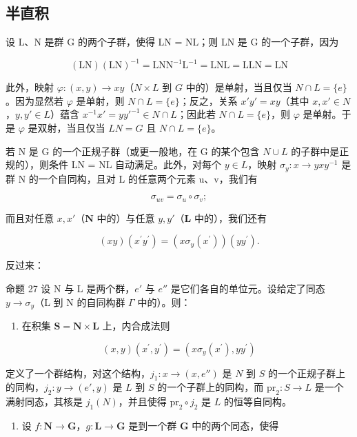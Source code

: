\subsection{半直积}

设 L、N 是群 G 的两个子群，使得 LN = NL；则 LN 是 G 的一个子群，因为

\[
(\mathrm{LN}) (\mathrm{LN}) ^ {- 1} = \mathrm{LNN} ^ {- 1} \mathrm{L} ^ {- 1} = \mathrm{LNL} = \mathrm{LLN} = \mathrm{LN}
\]

此外，映射 \(\varphi: (x, y) \to xy\)（\(N \times L\) 到 \(G\) 中的）是单射，当且仅当 \(N \cap L = \{e\}\)。因为显然若 \(\varphi\) 是单射，则 \(N \cap L = \{e\}\)；反之，关系 \(x' y' = xy\)（其中 \(x, x' \in N\)，\(y, y' \in L\)）蕴含 \(x^{-1}x' = yy'^{-1} \in N \cap L\)；因此若 \(N \cap L = \{e\}\)，则 \(\varphi\) 是单射。于是 \(\varphi\) 是双射，当且仅当 \(LN = G\) 且 \(N \cap L = \{e\}\)。

若 N 是 G 的一个正规子群（或更一般地，在 G 的某个包含 \(N \cup L\) 的子群中是正规的），则条件 LN = NL 自动满足。此外，对每个 \(y \in L\)，映射 \(\sigma_{y}: x \to yxy^{-1}\) 是群 N 的一个自同构，且对 L 的任意两个元素 u、v，我们有

\[
\sigma_ {u v} = \sigma_ {u} \circ \sigma_ {v};\tag{1}
\]

而且对任意 \(x, x'\)（\(\mathbf{N}\) 中的）与任意 \(y, y'\)（\(\mathbf{L}\) 中的），我们还有

\[
(x y) (x ^ {\prime} y ^ {\prime}) = (x \sigma_ {y} (x ^ {\prime})) (y y ^ {\prime}).\tag{2}
\]

反过来：

命题 27 设 N 与 L 是两个群，\(e'\) 与 \(e''\) 是它们各自的单位元。设给定了同态 \(y \to \sigma_y\)（L 到 N 的自同构群 \(\Gamma\) 中的）。则：

\begin{enumerate}
\def\labelenumi{\arabic{enumi})}
\tightlist
\item
  在积集 \(\mathbf{S} = \mathbf{N} \times \mathbf{L}\) 上，内合成法则
\end{enumerate}

\[
(x, y) (x ^ {\prime}, y ^ {\prime}) = (x \sigma_ {y} (x ^ {\prime}), y y ^ {\prime})\tag{3}
\]

定义了一个群结构，对这个结构，\(j_1: x \to (x, e'')\) 是 \(N\) 到 \(S\) 的一个正规子群上的同构，\(j_2: y \to (e', y)\) 是 \(L\) 到 \(S\) 的一个子群上的同构，而 \(\mathrm{pr}_2: S \to L\) 是一个满射同态，其核是 \(j_1(N)\)，并且使得 \(\mathrm{pr}_2 \circ j_2\) 是 \(L\) 的恒等自同构。

\begin{enumerate}
\def\labelenumi{\arabic{enumi})}
\setcounter{enumi}{1}
\tightlist
\item
  设 \(f: \mathbf{N} \to \mathbf{G}\)，\(g: \mathbf{L} \to \mathbf{G}\) 是到一个群 \(\mathbf{G}\) 中的两个同态，使得
\end{enumerate}

